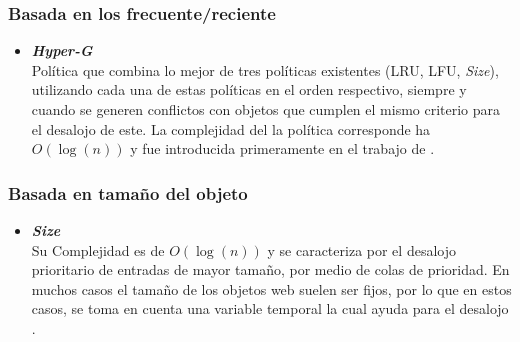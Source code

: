 \documentclass[12pt]{ociamthesis}  %
\begin{document}
\subsubsection{Basada en los frecuente/reciente}
\begin{itemize}
	\item \textbf{\textit{Hyper-G}}\\
	Política que combina lo mejor de tres políticas existentes (LRU, LFU, \textit{Size}), utilizando cada una de estas políticas en el orden respectivo, siempre y cuando se generen conflictos con objetos que cumplen el mismo criterio para el desalojo de este. La complejidad del la política corresponde ha $O(\log(n))$ y fue introducida primeramente en el trabajo de \cite{abrams1996removal}.
\end{itemize}
\clearpage

\subsubsection{Basada en tamaño del objeto}
\begin{itemize}
	\item \textbf{\textit{Size}}\\
	Su Complejidad es de $O(\log(n))$ y se caracteriza por el desalojo prioritario de entradas de mayor tamaño, por medio de colas de prioridad. En muchos casos el tamaño de los objetos web suelen ser fijos, por lo que en estos casos, se toma en cuenta una variable temporal la cual ayuda para el desalojo \cite{wong2006web}.
\end{itemize}
\end{document}

